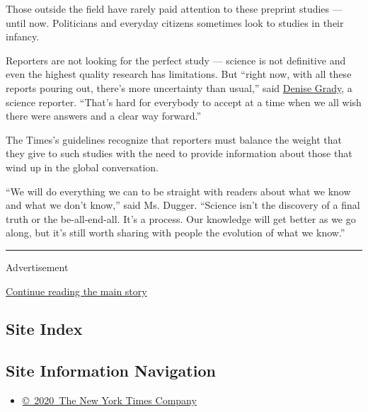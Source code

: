 Those outside the field have rarely paid attention to these preprint
studies --- until now. Politicians and everyday citizens sometimes look
to studies in their infancy.

Reporters are not looking for the perfect study --- science is not
definitive and even the highest quality research has limitations. But
``right now, with all these reports pouring out, there's more
uncertainty than usual,'' said
\href{https://www.nytimes3xbfgragh.onion/by/denise-grady}{Denise Grady},
a science reporter. ``That's hard for everybody to accept at a time when
we all wish there were answers and a clear way forward.''

The Times's guidelines recognize that reporters must balance the weight
that they give to such studies with the need to provide information
about those that wind up in the global conversation.

``We will do everything we can to be straight with readers about what we
know and what we don't know,'' said Ms. Dugger. ``Science isn't the
discovery of a final truth or the be-all-end-all. It's a process. Our
knowledge will get better as we go along, but it's still worth sharing
with people the evolution of what we know.''

\begin{center}\rule{0.5\linewidth}{\linethickness}\end{center}

Advertisement

\protect\hyperlink{after-bottom}{Continue reading the main story}

\hypertarget{site-index}{%
\subsection{Site Index}\label{site-index}}

\hypertarget{site-information-navigation}{%
\subsection{Site Information
Navigation}\label{site-information-navigation}}

\begin{itemize}
\tightlist
\item
  \href{https://help.nytimes3xbfgragh.onion/hc/en-us/articles/115014792127-Copyright-notice}{©~2020~The
  New York Times Company}
\end{itemize}


